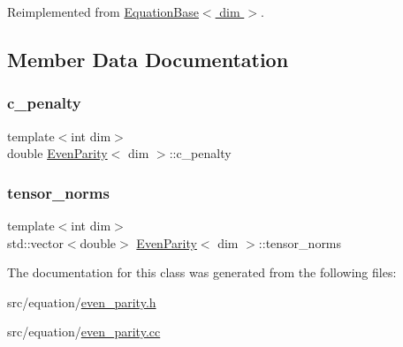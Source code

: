 Reimplemented from \hyperlink{class_equation_base_a39f0465a523e038302f624f89c08a2ee}{Equation\+Base$<$ dim $>$}.



\subsection{Member Data Documentation}
\mbox{\label{class_even_parity_a0eeae2ea4837040ebd8df4a997d82acd}} 
\subsubsection{\texorpdfstring{c\+\_\+penalty}{c\_penalty}}
{\footnotesize\ttfamily template$<$int dim$>$ \\
double \hyperlink{class_even_parity}{Even\+Parity}$<$ dim $>$\+::c\+\_\+penalty\hspace{0.3cm}{\ttfamily [private]}}

\mbox{\label{class_even_parity_aca63481c4a5de27e6acc2fc72d802303}} 
\subsubsection{\texorpdfstring{tensor\+\_\+norms}{tensor\_norms}}
{\footnotesize\ttfamily template$<$int dim$>$ \\
std\+::vector$<$double$>$ \hyperlink{class_even_parity}{Even\+Parity}$<$ dim $>$\+::tensor\+\_\+norms\hspace{0.3cm}{\ttfamily [private]}}



The documentation for this class was generated from the following files\+:\begin{DoxyCompactItemize}
\item 
src/equation/\hyperlink{even__parity_8h}{even\+\_\+parity.\+h}\item 
src/equation/\hyperlink{even__parity_8cc}{even\+\_\+parity.\+cc}\end{DoxyCompactItemize}
